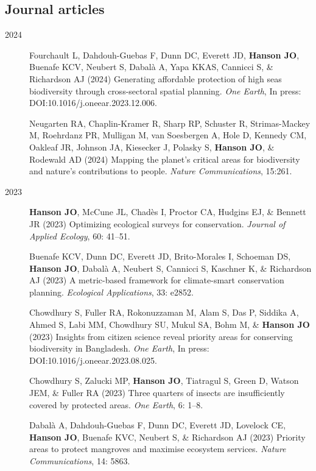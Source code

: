 \documentclass[12pt,a4paper]{article}
\begin{document}
\subsection*{Journal articles}
\begin{description}

\item[2024] Fourchault L, Dahdouh-Guebas F, Dunn DC, Everett JD, \textbf{Hanson JO}, Buenafe KCV, Neubert S, Dabalà A, Yapa KKAS, Cannicci S, \& Richardson AJ (2024) Generating affordable protection of high seas biodiversity through cross-sectoral spatial planning. \textit{One Earth}, In press: DOI:10.1016/j.oneear.2023.12.006.

\item[] Neugarten RA, Chaplin-Kramer R, Sharp RP, Schuster R, Strimas-Mackey M, Roehrdanz PR, Mulligan M, van Soesbergen A, Hole D, Kennedy CM, Oakleaf JR, Johnson JA, Kiesecker J, Polasky S, \textbf{Hanson JO}, \& Rodewald AD (2024) Mapping the planet's critical areas for biodiversity and nature's contributions to people. \textit{Nature Communications}, 15:261.

\item[2023] \textbf{Hanson JO}, McCune JL, Chadès I, Proctor CA, Hudgins EJ, \& Bennett JR (2023) Optimizing ecological surveys for conservation. \textit{Journal of Applied Ecology}, 60: 41--51.

\item[] Buenafe KCV, Dunn DC, Everett JD, Brito-Morales I, Schoeman DS, \textbf{Hanson JO}, Dabalà A, Neubert S, Cannicci S, Kaschner K, \& Richardson AJ (2023) A metric-based framework for climate-smart conservation planning. \textit{Ecological Applications}, 33: e2852.

\item[] Chowdhury S, Fuller RA, Rokonuzzaman M, Alam S, Das P, Siddika A, Ahmed S, Labi MM, Chowdhury SU, Mukul SA, Bohm M, \& \textbf{Hanson JO} (2023) Insights from citizen science reveal priority areas for conserving biodiversity in Bangladesh. \textit{One Earth}, In press: DOI:10.1016/j.oneear.2023.08.025.

\item[] Chowdhury S, Zalucki MP, \textbf{Hanson JO}, Tiatragul S, Green D, Watson JEM, \& Fuller RA (2023) Three quarters of insects are insufficiently covered by protected areas. \textit{One Earth}, 6: 1--8.

\item[] Dabalà A, Dahdouh-Guebas F, Dunn DC, Everett JD, Lovelock CE, \textbf{Hanson JO}, Buenafe KVC, Neubert S, \& Richardson AJ (2023) Priority areas to protect mangroves and maximise ecosystem services. \textit{Nature Communications}, 14: 5863.


\end{description}
\end{document}
